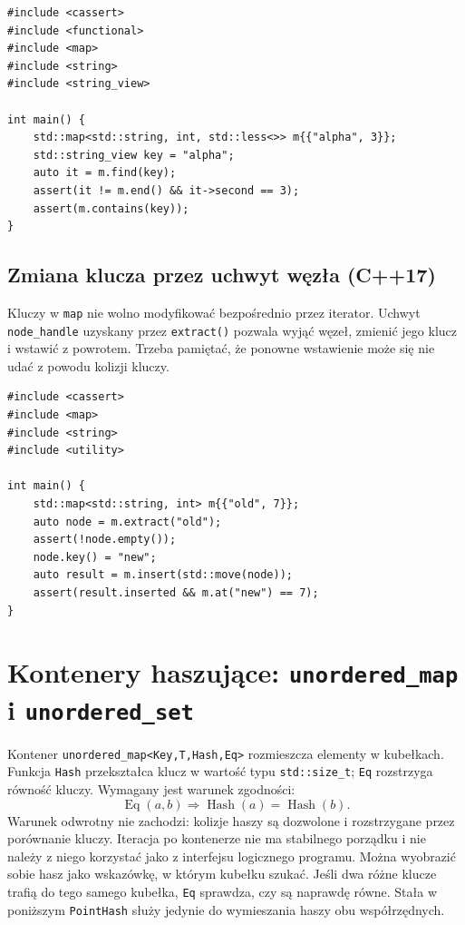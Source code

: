 \begin{lstlisting}[caption={Heterogeniczne wyszukiwanie w map (C++20); kompletny program.}]
#include <cassert>
#include <functional>
#include <map>
#include <string>
#include <string_view>

int main() {
    std::map<std::string, int, std::less<>> m{{"alpha", 3}};
    std::string_view key = "alpha";
    auto it = m.find(key);
    assert(it != m.end() && it->second == 3);
    assert(m.contains(key));
}
\end{lstlisting}

\subsection{Zmiana klucza przez uchwyt węzła (C++17)}

Kluczy w \texttt{map} nie wolno modyfikować bezpośrednio przez iterator.
Uchwyt \texttt{node\_handle} uzyskany przez \texttt{extract()} pozwala
wyjąć węzeł, zmienić jego klucz i wstawić z powrotem. Trzeba pamiętać,
że ponowne wstawienie może się nie udać z powodu kolizji kluczy.

\begin{lstlisting}[caption={Zmiana klucza przez extract (C++17); kompletny program.}]
#include <cassert>
#include <map>
#include <string>
#include <utility>

int main() {
    std::map<std::string, int> m{{"old", 7}};
    auto node = m.extract("old");
    assert(!node.empty());
    node.key() = "new";
    auto result = m.insert(std::move(node));
    assert(result.inserted && m.at("new") == 7);
}
\end{lstlisting}

\section{Kontenery haszujące: \texttt{unordered\_map} i \texttt{unordered\_set}}
\label{sec:cpp13-unordered}

Kontener \texttt{unordered\_map<Key,T,Hash,Eq>} rozmieszcza elementy
w kubełkach. Funkcja \texttt{Hash} przekształca klucz w wartość typu
\texttt{std::size\_t}; \texttt{Eq} rozstrzyga równość kluczy.
Wymagany jest warunek zgodności:
\[
\operatorname{Eq}(a,b) \Longrightarrow
\operatorname{Hash}(a)=\operatorname{Hash}(b).
\]
Warunek odwrotny nie zachodzi: kolizje haszy są dozwolone i
rozstrzygane przez porównanie kluczy. Iteracja po kontenerze
nie ma stabilnego porządku i nie należy z niego korzystać jako z
interfejsu logicznego programu.
Można wyobrazić sobie hasz jako wskazówkę, w którym kubełku szukać.
Jeśli dwa różne klucze trafią do tego samego kubełka, \texttt{Eq}
sprawdza, czy są naprawdę równe. Stała w poniższym \texttt{PointHash}
służy jedynie do wymieszania haszy obu współrzędnych.

